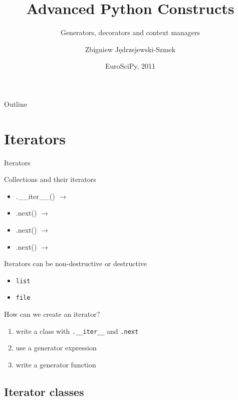 \documentclass{beamer}
\title{Advanced Python Constructs}
\subtitle{Generators, decorators and context managers}
\author{Zbigniew Jędrzejewski-Szmek}
\date{EuroSciPy, 2011}
\newcommand{\lra}{\ensuremath{\longrightarrow}}
\begin{document}
\begin{frame}
  \titlepage
\end{frame}

\begin{frame}{Outline}
  \tableofcontents
\end{frame}

\section{Iterators}

\begin{frame}{}
  \center\Huge Iterators
\end{frame}

\begin{frame}[fragile]{Collections and their iterators}
  \begin{itemize}
    \item
      \pause.\_\_iter\_\_() \pause \lra {}
      \pause
    \item
      .next() \lra {}
      \pause
    \item
      .next() \lra {}
      \pause
    \item
      .next() \lra {}
  \end{itemize}
\end{frame}

\begin{frame}{Iterators can be non-destructive or destructive}
  \begin{itemize}
    \item \texttt{list}
    \item \texttt{file}
  \end{itemize}
\end{frame}

\begin{frame}[fragile]{How can we create an iterator?}

  \begin{enumerate}[<+->]
    \item write a class with \verb|.__iter__| and \verb|.next|
    \item use a generator expression
    \item write a generator function
  \end{enumerate}
\end{frame}

\subsection{Iterator classes}
\end{document}
